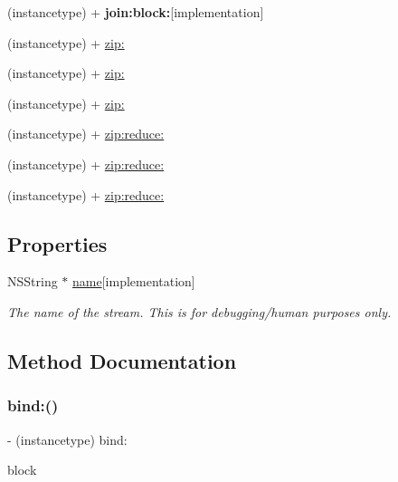 \begin{DoxyCompactItemize}
(instancetype) + {\bfseries join\+:block\+:}{\ttfamily  \mbox{[}implementation\mbox{]}}
\item 
(instancetype) + \mbox{\hyperlink{interface_r_a_c_stream_a90ef5f217dc285dc831cc0d45166a529}{zip\+:}}
\item 
(instancetype) + \mbox{\hyperlink{interface_r_a_c_stream_a90ef5f217dc285dc831cc0d45166a529}{zip\+:}}
\item 
(instancetype) + \mbox{\hyperlink{interface_r_a_c_stream_a90ef5f217dc285dc831cc0d45166a529}{zip\+:}}
\item 
(instancetype) + \mbox{\hyperlink{interface_r_a_c_stream_aba7b1d8c9ac130afad52b0baca8ae016}{zip\+:reduce\+:}}
\item 
(instancetype) + \mbox{\hyperlink{interface_r_a_c_stream_aba7b1d8c9ac130afad52b0baca8ae016}{zip\+:reduce\+:}}
\item 
(instancetype) + \mbox{\hyperlink{interface_r_a_c_stream_aba7b1d8c9ac130afad52b0baca8ae016}{zip\+:reduce\+:}}
\end{DoxyCompactItemize}
\subsection*{Properties}
\begin{DoxyCompactItemize}
\item 
\mbox{\label{interface_r_a_c_stream_a820449e7e23470d83bec611bd587652e}} 
N\+S\+String $\ast$ \mbox{\hyperlink{interface_r_a_c_stream_a820449e7e23470d83bec611bd587652e}{name}}{\ttfamily  \mbox{[}implementation\mbox{]}}
\begin{DoxyCompactList}\small\item\em The name of the stream. This is for debugging/human purposes only. \end{DoxyCompactList}\end{DoxyCompactItemize}


\subsection{Method Documentation}
\mbox{\label{interface_r_a_c_stream_a8638bfba1497aa1b14b098857b4c62e2}} 
\subsubsection{\texorpdfstring{bind\+:()}{bind:()}\hspace{0.1cm}{\footnotesize\ttfamily [1/3]}}
{\footnotesize\ttfamily -\/ (instancetype) bind\+: \begin{DoxyParamCaption}\item[{(R\+A\+C\+Stream\+Bind\+Block($^\wedge$)(void))}]{block }\end{DoxyParamCaption}}

